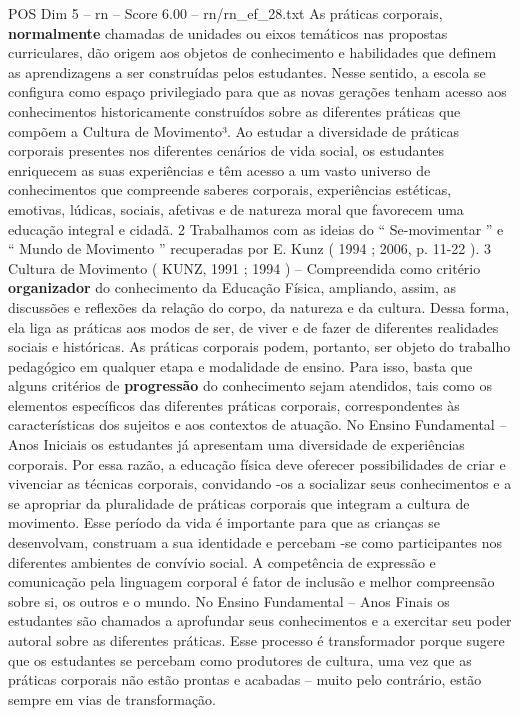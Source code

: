 \begin{textsample}{POS Dim 5 – rn – Score 6.00 – rn/rn\_ef\_28.txt}  \label{ex:f5_pos_145}
As práticas corporais, \textbf{normalmente} chamadas de unidades ou eixos temáticos nas propostas curriculares, dão origem aos objetos de conhecimento e habilidades que definem as aprendizagens a ser construídas pelos estudantes.
Nesse sentido, a escola se configura como espaço privilegiado para que as novas gerações tenham acesso aos conhecimentos historicamente construídos sobre as diferentes práticas que compõem a Cultura de Movimento³.
Ao estudar a diversidade de práticas corporais presentes nos diferentes cenários de vida social, os estudantes enriquecem as suas experiências e têm acesso a um vasto universo de conhecimentos que compreende saberes corporais, experiências estéticas, emotivas, lúdicas, sociais, afetivas e de natureza moral que favorecem uma educação integral e cidadã. 2 Trabalhamos com as ideias do “ Se-movimentar ” e “ Mundo de Movimento ” recuperadas por E.
Kunz ( 1994 ; 2006, p. 11-22 ). 3 Cultura de Movimento ( KUNZ, 1991 ; 1994 ) – Compreendida como critério \textbf{organizador} do conhecimento da Educação Física, ampliando, assim, as discussões e reflexões da relação do corpo, da natureza e da cultura.
Dessa forma, ela liga as práticas aos modos de ser, de viver e de fazer de diferentes realidades sociais e históricas.
As práticas corporais podem, portanto, ser objeto do trabalho pedagógico em qualquer etapa e modalidade de ensino.
Para isso, basta que alguns critérios de \textbf{progressão} do conhecimento sejam atendidos, tais como os elementos específicos das diferentes práticas corporais, correspondentes às características dos sujeitos e aos contextos de atuação.
No Ensino Fundamental – Anos Iniciais os estudantes já apresentam uma diversidade de experiências corporais.
Por essa razão, a educação física deve oferecer possibilidades de criar e vivenciar as técnicas corporais, convidando -os a socializar seus conhecimentos e a se apropriar da pluralidade de práticas corporais que integram a cultura de movimento.
Esse período da vida é importante para que as crianças se desenvolvam, construam a sua identidade e percebam -se como participantes nos diferentes ambientes de convívio social.
A competência de expressão e comunicação pela linguagem corporal é fator de inclusão e melhor compreensão sobre si, os outros e o mundo.
No Ensino Fundamental – Anos Finais os estudantes são chamados a aprofundar seus conhecimentos e a exercitar seu poder autoral sobre as diferentes práticas.
Esse processo é transformador porque sugere que os estudantes se percebam como produtores de cultura, uma vez que as práticas corporais não estão prontas e acabadas – muito pelo contrário, estão sempre em vias de transformação.

\end{textsample}
